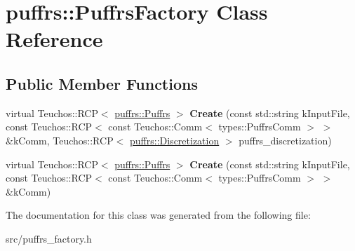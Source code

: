 \hypertarget{classpuffrs_1_1PuffrsFactory}{}\section{puffrs\+:\+:Puffrs\+Factory Class Reference}
\label{classpuffrs_1_1PuffrsFactory}
\subsection*{Public Member Functions}
\begin{DoxyCompactItemize}
\item 
\mbox{\label{classpuffrs_1_1PuffrsFactory_a1b0f9bebc29e95a6e02a0a10d33d378c}} 
virtual Teuchos\+::\+R\+CP$<$ \hyperlink{classpuffrs_1_1Puffrs}{puffrs\+::\+Puffrs} $>$ {\bfseries Create} (const std\+::string k\+Input\+File, const Teuchos\+::\+R\+CP$<$ const Teuchos\+::\+Comm$<$ types\+::\+Puffrs\+Comm $>$ $>$ \&k\+Comm, Teuchos\+::\+R\+CP$<$ \hyperlink{classpuffrs_1_1Discretization}{puffrs\+::\+Discretization} $>$ puffrs\+\_\+discretization)
\item 
\mbox{\label{classpuffrs_1_1PuffrsFactory_aaa29b92655e69498acaac735b673b409}} 
virtual Teuchos\+::\+R\+CP$<$ \hyperlink{classpuffrs_1_1Puffrs}{puffrs\+::\+Puffrs} $>$ {\bfseries Create} (const std\+::string k\+Input\+File, const Teuchos\+::\+R\+CP$<$ const Teuchos\+::\+Comm$<$ types\+::\+Puffrs\+Comm $>$ $>$ \&k\+Comm)
\end{DoxyCompactItemize}


The documentation for this class was generated from the following file\+:\begin{DoxyCompactItemize}
\item 
src/puffrs\+\_\+factory.\+h\end{DoxyCompactItemize}
